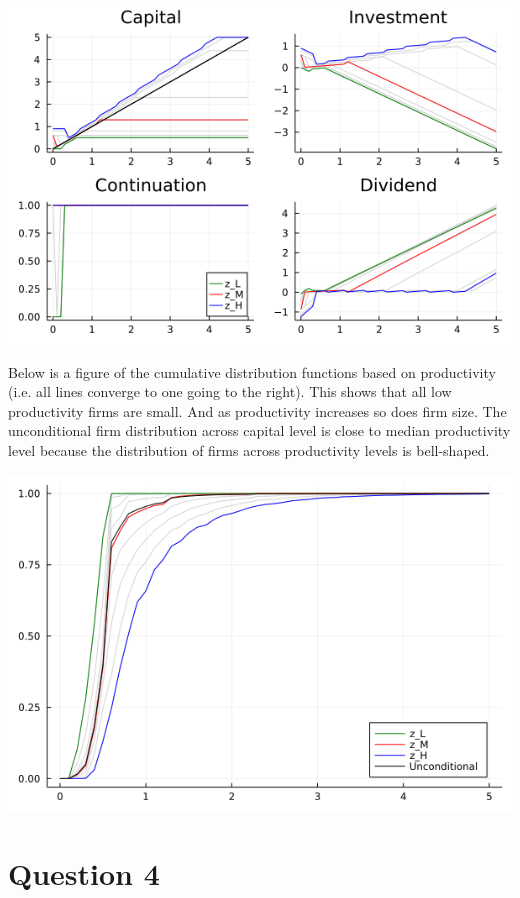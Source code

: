 \documentclass{article}
\begin{document}
\bigskip

\includegraphics[scale = .75]{policy_functions.png}

\pagebreak

Below is a figure of the cumulative distribution functions based on productivity (i.e. all lines converge to one going to the right). This shows that all low productivity firms are small. And as productivity increases so does firm size.  The unconditional firm distribution across capital level is close to median productivity level because the distribution of firms across productivity levels is bell-shaped.

\bigskip

\includegraphics[scale = .5]{cdf.png}

\section*{Question 4}
\end{document}
